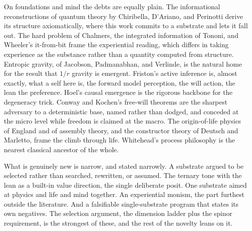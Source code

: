 On foundations and mind the debts are equally plain. The informational reconstructions of quantum theory by Chiribella, D'Ariano, and Perinotti derive its structure axiomatically, where this work commits to a substrate and lets it fall out. The hard problem of Chalmers, the integrated information of Tononi, and Wheeler's it-from-bit frame the experiential reading, which differs in taking experience as the substance rather than a quantity computed from structure. Entropic gravity, of Jacobson, Padmanabhan, and Verlinde, is the natural home for the result that $1/r$ gravity is emergent. Friston's active inference is, almost exactly, what a self here is, the forward model perception, the will action, the lean the preference. Hoel's causal emergence is the rigorous backbone for the degeneracy trick. Conway and Kochen's free-will theorems are the sharpest adversary to a deterministic base, named rather than dodged, and conceded at the micro level while freedom is claimed at the macro. The origin-of-life physics of England and of assembly theory, and the constructor theory of Deutsch and Marletto, frame the climb through life. Whitehead's process philosophy is the nearest classical ancestor of the whole.

What is genuinely new is narrow, and stated narrowly. A substrate argued to be selected rather than searched, rewritten, or assumed. The ternary tone with the lean as a built-in value direction, the single deliberate posit. One substrate aimed at physics and life and mind together. An experiential monism, the part furthest outside the literature. And a falsifiable single-substrate program that states its own negatives. The selection argument, the dimension ladder plus the spinor requirement, is the strongest of these, and the rest of the novelty leans on it.
